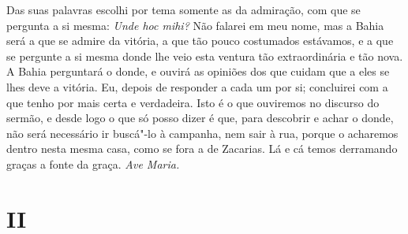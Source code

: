 Das suas palavras escolhi por tema somente as da admiração, com que se
pergunta a si mesma: \emph{Unde hoc mihi?} Não falarei em meu nome, mas
a Bahia será a que se admire da vitória, a que tão pouco costumados
estávamos, e a que se pergunte a si mesma donde lhe veio esta ventura
tão extraordinária e tão nova. A Bahia perguntará o donde, e ouvirá as
opiniões dos que cuidam que a eles se lhes deve a vitória. Eu, depois de
responder a cada um por si; concluirei com a que tenho por mais certa e
verdadeira. Isto é o que ouviremos no discurso do sermão, e desde logo o
que só posso dizer é que, para descobrir e achar o donde, não será
necessário ir buscá"-lo à campanha, nem sair à rua, porque o acharemos
dentro nesta mesma casa, como se fora a de Zacarias. Lá e cá temos
derramando graças a fonte da graça. \emph{Ave Maria.}

\section*{II}

